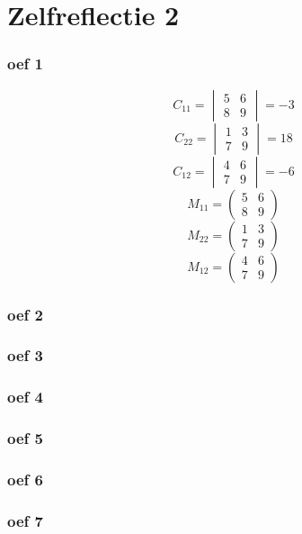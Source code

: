 \documentclass[lineaire_algebra_oplossingen.tex]{subfiles}
\begin{document}
\part{Zelfreflectie 2}
\section{oef 1}
\[
C_{11} = 
\begin{vmatrix}
5 & 6 \\
8 & 9
\end{vmatrix}
=-3
\]
\[
C_{22}= 
\begin{vmatrix}
1 & 3 \\
7 & 9
\end{vmatrix}
=
18
\]
\[
C_{12} =
\begin{vmatrix}
4 & 6 \\
7 & 9
\end{vmatrix}
=-6
\]
\[
M_{11} = 
\begin{pmatrix}
5 & 6 \\
8 & 9
\end{pmatrix}
\]
\[
M_{22}= 
\begin{pmatrix}
1 & 3 \\
7 & 9
\end{pmatrix}
\]
\[
M_{12} =
\begin{pmatrix}
4 & 6 \\
7 & 9
\end{pmatrix}
\]
\section{oef 2}
\section{oef 3}
\section{oef 4}
\section{oef 5}
\section{oef 6}
\section{oef 7}
\end{document}
